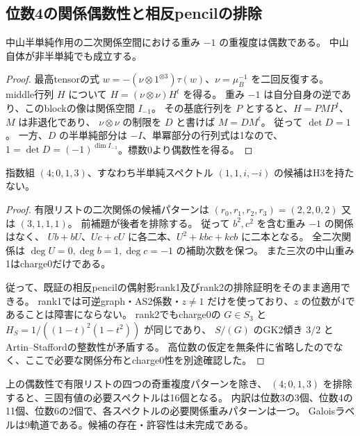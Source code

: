 \subsection{位数4の関係偶数性と相反pencilの排除}
\label{subsec:cubic-fourth-root-spectrum}
\begin{lemma}
\label{lem:cubic-minus-one-relation-even}
中山半単純作用の二次関係空間における重み $-1$ の重複度は偶数である。
中山自体が非半単純でも成立する。
\end{lemma}
\begin{proof}
最高tensorの式 $w=-(\nu\otimes1^{\otimes3})\tau(w)$、$\nu=\mu_B^{-1}$ を二回反復する。
middle行列 $H$ について $H=(\nu\otimes\nu)H^t$ を得る。
重み $-1$ は自分自身の逆であり、このblockの像は関係空間 $I_{-1}$。
その基底行列を $P$ とすると、$H=PMP^t$、$M$ は非退化であり、
$\nu\otimes\nu$ の制限を $D$ と書けば $M=DM^t$。
従って $\det D=1$。
一方、$D$ の半単純部分は $-I$、単冪部分の行列式は1なので、
$1=\det D=(-1)^{\dim I_{-1}}$。標数0より偶数性を得る。
\end{proof}

\begin{theorem}
\label{thm:cubic-fourth-root-unit-pencil-empty}
指数組 $(4;0,1,3)$、すなわち半単純スペクトル $(1,1,i,-i)$ の候補はH3を持たない。
\end{theorem}
\begin{proof}
有限リストの二次関係の候補パターンは
$(r_0,r_1,r_2,r_3)=(2,2,0,2)$ 又は $(3,1,1,1)$。
前補題が後者を排除する。
従って $b^2,c^2$ を含む重み $-1$ の関係はなく、
$Ub+bU$、$Uc+cU$ に各二本、$U^2+kbc+kcb$ に二本となる。
全二次関係は $\deg U=0,\deg b=1,\deg c=-1$ の補助次数を保つ。
また三次の中山重み1はcharge0だけである。

従って、既証の相反pencilの偶射影rank1及びrank2の排除証明をそのまま適用できる。
rank1では可逆graph・AS2係数・$z\ne1$ だけを使っており、$z$ の位数が4であることは障害にならない。
rank2でもcharge0の $G\in S_3$ と $H_S=1/((1-t)^2(1-t^2))$ が同じであり、
$S/(G)$ のGK2傾き $3/2$ とArtin--Staffordの整数性が矛盾する。
高位数の仮定を無条件に省略したのでなく、ここで必要な関係分布とcharge0性を別途確認した。
\end{proof}

\begin{corollary}
\label{cor:cubic-three-eigenvalue-16-list}
上の偶数性で有限リストの四つの奇重複度パターンを除き、
$(4;0,1,3)$ を排除すると、三固有値の必要スペクトルは16個となる。
内訳は位数3の3個、位数4の11個、位数6の2個で、各スペクトルの必要関係重みパターンは一つ。
Galoisラベルは9軌道である。候補の存在・許容性は未完成である。
\end{corollary}

